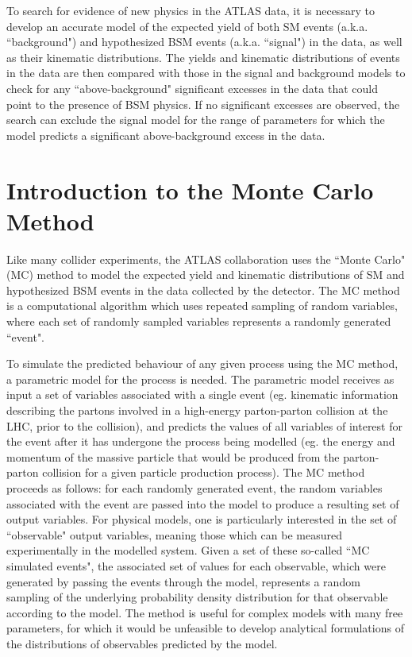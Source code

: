 \label{chapter:mc}

To search for evidence of new physics in the ATLAS data, it is necessary to develop an accurate model of the expected yield of both SM events (a.k.a. ``background") and hypothesized BSM events (a.k.a. ``signal") in the data, as well as their kinematic distributions. The yields and kinematic distributions of events in the data are then compared with those in the signal and background models to check for any ``above-background" significant excesses in the data that could point to the presence of BSM physics. If no significant excesses are observed, the search can exclude the signal model for the range of parameters for which the model predicts a significant above-background excess in the data.

\section{Introduction to the Monte Carlo Method}

Like many collider experiments, the ATLAS collaboration uses the ``Monte Carlo" (MC) method to model the expected yield and kinematic distributions of SM and hypothesized BSM events in the data collected by the detector. The MC method is a computational algorithm which uses repeated sampling of random variables, where each set of randomly sampled variables represents a randomly generated ``event". 

To simulate the predicted behaviour of any given process using the MC method, a parametric model for the process is needed. The parametric model receives as input a set of variables associated with a single event (eg. kinematic information describing the partons involved in a high-energy parton-parton collision at the LHC, prior to the collision), and predicts the values of all variables of interest for the event after it has undergone the process being modelled (eg. the energy and momentum of the massive particle that would be produced from the parton-parton collision for a given particle production process). The MC method proceeds as follows: for each randomly generated event, the random variables associated with the event are passed into the model to produce a resulting set of output variables. For physical models, one is particularly interested in the set of ``observable" output variables, meaning those which can be measured experimentally in the modelled system. Given a set of these so-called ``MC simulated events", the associated set of values for each observable, which were generated by passing the events through the model, represents a random sampling of the underlying probability density distribution for that observable according to the model.  The method is useful for complex models with many free parameters, for which it would be unfeasible to develop analytical formulations of the distributions of observables predicted by the model.

